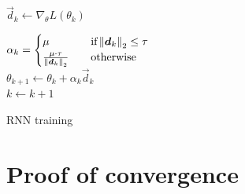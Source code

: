 \begin{algorithm}[]
{		
			{$\vec{d}_k \gets \nabla_{\theta}L(\theta_k)$ \\
			\label{algo:line:condition}
		}
		
		$\alpha_k = 
		\begin{cases}
			\mu  \quad &\mbox{if} \left\Vert \boldsymbol{d}_k \right\Vert_2 \leq \tau\\
			\frac{\mu \cdot \tau}{\left\Vert \boldsymbol{d}_k \right\Vert_2} \quad & \mbox{otherwise}
		\end{cases}$\\
		
		$\theta_{k+1} \gets \theta_k + \alpha_k \vec{d}_k$\\
		$k\gets k+1$
	}
	\caption{RNN training}
	\label{algo:complete_solution}
\end{algorithm}

\section{Proof of convergence}

